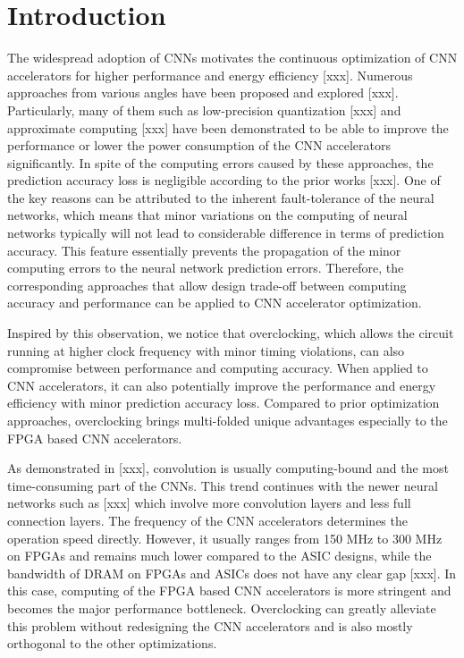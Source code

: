 \section{Introduction} \label{sec:intro}
The widespread adoption of CNNs motivates the 
continuous optimization of CNN accelerators for higher 
performance and energy efficiency [xxx]. Numerous approaches from various 
angles have been proposed and explored [xxx]. Particularly, many of them such as 
low-precision quantization [xxx] and approximate computing [xxx] have been demonstrated to 
be able to improve the performance or lower the power consumption of the CNN 
accelerators significantly. In spite of the computing errors caused by these approaches, 
the prediction accuracy loss is negligible according to the prior works [xxx].
One of the key reasons can be attributed to the inherent fault-tolerance of 
the neural networks, which means that minor variations on the 
computing of neural networks typically will not lead to considerable 
difference in terms of prediction accuracy. This 
feature essentially prevents the propagation of 
the minor computing errors to the neural network prediction errors. 
Therefore, the corresponding approaches that allow design trade-off 
between computing accuracy and performance can be applied to CNN 
accelerator optimization.

Inspired by this observation, we notice that overclocking, which 
allows the circuit running at higher clock frequency with minor 
timing violations, can also compromise between performance 
and computing accuracy. When applied to CNN accelerators, 
it can also potentially improve the performance and energy 
efficiency with minor prediction accuracy loss.
Compared to prior optimization approaches, overclocking brings 
multi-folded unique advantages especially to the FPGA based CNN 
accelerators. 

As demonstrated in [xxx], convolution is usually 
computing-bound and the most time-consuming part of the CNNs. 
This trend continues with the newer neural networks 
such as [xxx] which involve more convolution layers 
and less full connection layers. The frequency of the CNN 
accelerators determines the operation speed directly. However, 
it usually ranges from 150 MHz to 300 MHz on FPGAs and 
remains much lower compared to the ASIC designs, while the 
bandwidth of DRAM on FPGAs and ASICs does not have any 
clear gap [xxx]. In this case, computing of the FPGA based CNN 
accelerators is more stringent and becomes the major 
performance bottleneck. Overclocking can greatly alleviate this 
problem without redesigning the CNN accelerators and is 
also mostly orthogonal to the other optimizations. 

